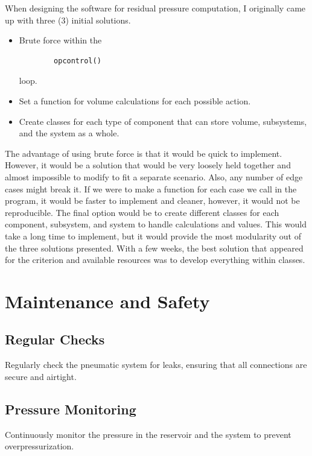 
When designing the software for residual pressure computation, I originally came up with three (3) initial solutions. 
\begin{itemize}
    \item Brute force within the \begin{verbatim}
        opcontrol()
    \end{verbatim} loop.
    \item Set a function for volume calculations for each possible action.
    \item Create classes for each type of component that can store volume, subsystems, and the system as a whole.
\end{itemize}
The advantage of using brute force is that it would be quick to implement. However, it would be a solution that would be very loosely held together and almost impossible to modify to fit a separate scenario. Also, any number of edge cases might break it. If we were to make a function for each case we call in the program, it would be faster to implement and cleaner, however, it would not be reproducible. The final option would be to create different classes for each component, subsystem, and system to handle calculations and values. This would take a long time to implement, but it would provide the most modularity out of the three solutions presented. With a few weeks, the best solution that appeared for the criterion and available resources was to develop everything within classes. 

\section*{Maintenance and Safety}

\subsection*{Regular Checks}
Regularly check the pneumatic system for leaks, ensuring that all connections are secure and airtight.

\subsection*{Pressure Monitoring}
Continuously monitor the pressure in the reservoir and the system to prevent overpressurization.


